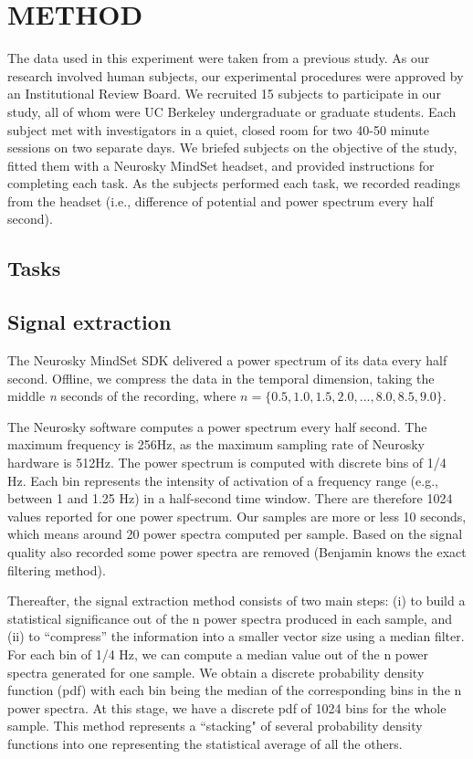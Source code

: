 \section{\uppercase{Method}}

The data used in this experiment were taken from a previous study. As our research involved human subjects, our experimental procedures were approved by an Institutional Review Board. We recruited 15 subjects to participate in our study, all of whom were UC Berkeley undergraduate or graduate students. Each subject met with investigators in a quiet, closed room for two 40-50 minute sessions on two separate days. We briefed subjects on the objective of the study, fitted them with a Neurosky MindSet headset, and provided instructions for completing each task. As the subjects performed each task, we recorded readings from the headset (i.e., difference of potential and power spectrum every half second).

\subsection{Tasks}


\subsection{Signal extraction}

The Neurosky MindSet SDK delivered a power spectrum of its data every half second. Offline, we compress the data in the temporal dimension, taking the middle \textit{n} seconds of the recording, where $n = \{0.5, 1.0,1.5, 2.0,...,8.0, 8.5, 9.0\}$. 

The Neurosky software computes a power spectrum every half second. The maximum frequency is 256Hz, as the maximum sampling rate of Neurosky hardware is 512Hz. The power spectrum is computed with discrete bins of 1/4 Hz. Each bin represents the intensity of activation of a frequency range (e.g., between 1 and 1.25 Hz) in a half-second time window. There are therefore 1024 values reported for one power spectrum. Our samples are more or less 10 seconds, which means around 20 power spectra computed per sample. Based on the signal quality also recorded some power spectra are removed (Benjamin knows the exact filtering method).

Thereafter, the signal extraction method consists of two main steps: (i) to build a statistical significance out of the n power spectra produced in each sample, and (ii) to ``compress'' the information into a smaller vector size using a median filter. For each bin of 1/4 Hz, we can compute a median value out of the n power spectra generated for one sample. We obtain a discrete probability density function (pdf) with each bin being the median of the corresponding bins in the n power spectra. At this stage, we have a discrete pdf of 1024 bins for the whole sample. This method represents a ``stacking" of several probability density functions into one representing the statistical average of all the others.

